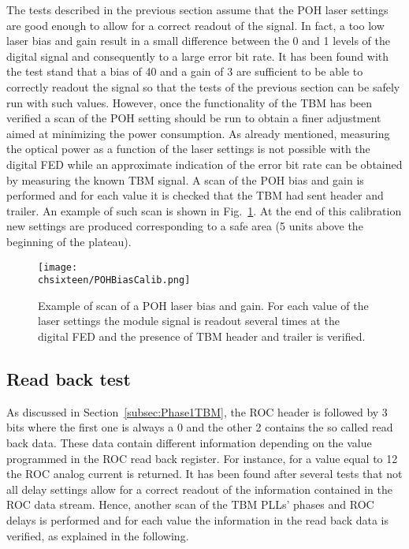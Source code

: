 The tests described in the previous section assume that the POH laser settings are good enough to allow for a correct readout of the signal.
In fact, a too low laser bias and gain result in a small difference between the 0 and 1 levels of the digital signal and consequently to a large error bit rate.
It has been found with the test stand that a bias of 40 and a gain of 3 are sufficient to be able to correctly readout the signal so that the tests of the previous section can be safely run with such values.
However, once the functionality of the TBM has been verified a scan of the POH setting should be run to obtain a finer adjustment aimed at minimizing the power consumption.
As already mentioned, measuring the optical power as a function of the laser settings is not possible with the digital FED
while an approximate indication of the error bit rate can be obtained by measuring the known TBM signal.
A scan of the POH bias and gain is performed and for each value it is checked that the TBM had sent header and trailer. An example of such scan is shown in Fig.~\ref{fig:POHBiasCalib}.
At the end of this calibration new settings are produced corresponding to a safe area (5 units above the beginning of the plateau).

\begin{figure}[!htb]
 \begin{center}
  \texttt{[image: \\chsixteen/POHBiasCalib.png]}
 \end{center}
 \caption{Example of scan of a POH laser bias and gain. For each value of the laser settings the module signal is readout several times at the digital FED and the presence of TBM header and trailer is verified.}
 \label{fig:POHBiasCalib}
\end{figure} 

\subsection{Read back test}

As discussed in Section~\ref{subsec:Phase1TBM}, the ROC header is followed by 3 bits where the first one is always a 0 and the other 2 contains the so called read back data.
These data contain different information depending on the value programmed in the ROC read back register. For instance, for a value equal to 12 the ROC analog current is returned.
It has been found after several tests that not all delay settings allow for a correct readout of the information contained in the ROC data stream.
Hence, another scan of the TBM PLLs' phases and ROC delays is performed and for each value the information in the read back data is verified, as explained in the following.

